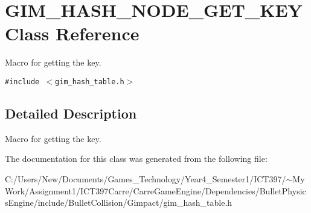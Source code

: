 \hypertarget{class_g_i_m___h_a_s_h___n_o_d_e___g_e_t___k_e_y}{
\section{GIM\_\-HASH\_\-NODE\_\-GET\_\-KEY Class Reference}
\label{class_g_i_m___h_a_s_h___n_o_d_e___g_e_t___k_e_y}
}
Macro for getting the key.  


{\tt \#include $<$gim\_\-hash\_\-table.h$>$}



\subsection{Detailed Description}
Macro for getting the key. 

The documentation for this class was generated from the following file:\begin{CompactItemize}
\item 
C:/Users/New/Documents/Games\_\-Technology/Year4\_\-Semester1/ICT397/$\sim$My Work/Assignment1/ICT397Carre/CarreGameEngine/Dependencies/BulletPhysicsEngine/include/BulletCollision/Gimpact/gim\_\-hash\_\-table.h\end{CompactItemize}
